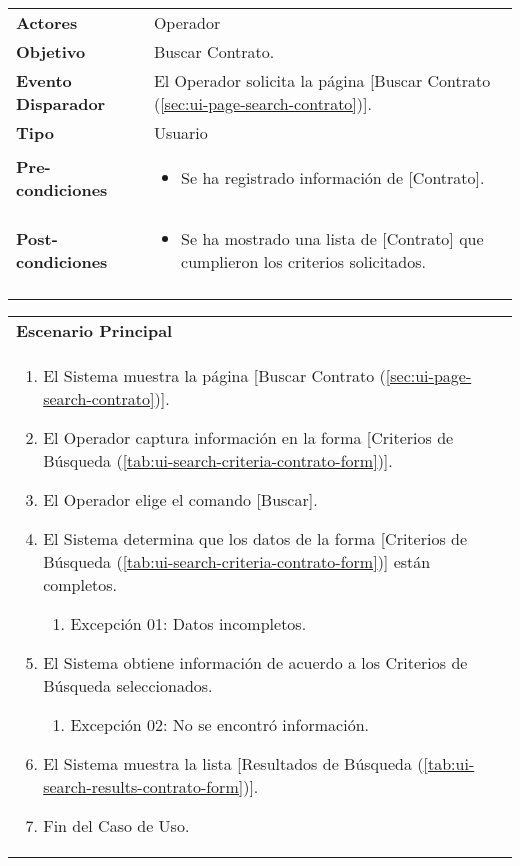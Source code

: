 	\begin{tabular}{ p{3.5cm} p{11.5cm} }
		\textbf{Actores} & Operador\\
		\textbf{Objetivo} & Buscar Contrato.\\
		\textbf{Evento Disparador} & El Operador solicita la p\'agina [Buscar Contrato (\ref{sec:ui-page-search-contrato})].\\
		\textbf{Tipo} & Usuario\\
		\textbf{Pre-condiciones} &
			\begin{minipage}[t]{0.6\textwidth}
			\begin{itemize}[noitemsep,nolistsep]
			\setlength{\itemindent}{-.5cm}
				\item Se ha registrado informaci\'on de [Contrato].
			\end{itemize}
			\end{minipage} \\
		\textbf{Post-condiciones} &
			\begin{minipage}[t]{0.6\textwidth}
			\begin{itemize}[noitemsep,nolistsep]
			\setlength{\itemindent}{-.5cm}
				\item Se ha mostrado una lista de [Contrato] que cumplieron los criterios solicitados.
			\end{itemize}
			\end{minipage} \\
		\\
	\end{tabular}
	
	\begin{tabular}{ p{15.5cm} }
		\textbf{Escenario Principal} \\
		\begin{enumerate}
			\item El Sistema muestra la p\'agina [Buscar Contrato (\ref{sec:ui-page-search-contrato})].
			\item El Operador captura informaci\'on en la forma [Criterios de B\'usqueda (\ref{tab:ui-search-criteria-contrato-form})].
			\item El Operador elige el comando [Buscar].
			\item El Sistema determina que los datos de la forma [Criterios de B\'usqueda (\ref{tab:ui-search-criteria-contrato-form})] est\'an completos.
				\begin{enumerate}
					\item Excepci\'on 01: Datos incompletos.
				\end{enumerate}
			\item El Sistema obtiene informaci\'on de acuerdo a los Criterios de B\'usqueda seleccionados.
				\begin{enumerate}
					\item Excepci\'on 02: No se encontr\'o informaci\'on.
				\end{enumerate}
			\item El Sistema muestra la lista [Resultados de B\'usqueda (\ref{tab:ui-search-results-contrato-form})].
			\item Fin del Caso de Uso.
		\end{enumerate}
	\end{tabular}
	
